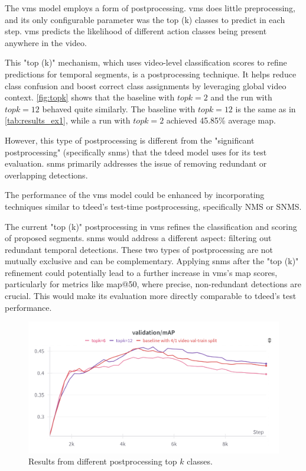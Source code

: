 The \acrshort{vms} model employs a form of postprocessing. \acrshort{vms} does little preprocessing, and its only configurable parameter was the top (k) classes to predict in each step. \acrshort{vms} predicts the likelihood of different action classes being present anywhere in the video. 

This "top (k)" mechanism, which uses video-level classification scores to refine predictions for temporal segments, is a postprocessing technique. It helps reduce class confusion and boost correct class assignments by leveraging global video context. \autoref{fig:topk} shows that the baseline with \(topk=2\) and the run with \(topk=12\) behaved quite similarly. The baseline with \(topk=12\) is the same as in \autoref{tab:results_ex1}, while a run with \(topk=2\) achieved 45.85\% average \acrshort{map}.

However, this type of postprocessing is different from the "significant postprocessing" (specifically \acrfull{snms}) that the \acrshort{tdeed} model uses for its test evaluation. \acrshort{snms} primarily addresses the issue of removing redundant or overlapping detections.

The performance of the \acrshort{vms} model could be enhanced by incorporating techniques similar to \acrshort{tdeed}'s test-time postprocessing, specifically NMS or SNMS.

The current "top (k)" postprocessing in \acrshort{vms} refines the classification and scoring of proposed segments.
\acrshort{snms} would address a different aspect: filtering out redundant temporal detections.
These two types of postprocessing are not mutually exclusive and can be complementary. Applying \acrshort{snms} after the "top (k)" refinement could potentially lead to a further increase in \acrshort{vms}'s \acrshort{map} scores, particularly for metrics like \acrshort{map}@50, where precise, non-redundant detections are crucial. This would make its evaluation more directly comparable to \acrshort{tdeed}'s test performance.

\begin{figure}
    \centering
    \includegraphics[width=0.75\linewidth]{figures/topk_classes.png}
    \caption{Results from different postprocessing top \(k\) classes.}
    \label{fig:topk}
\end{figure}


